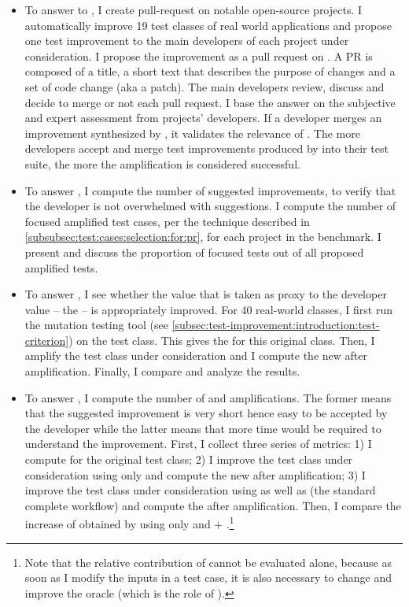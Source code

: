 \begin{itemize}
	\item \textbf{\rqpullrequest}
	To answer to \rqpullrequest, I create pull-request on notable open-source projects.
	I automatically improve 19 test classes of real world applications and propose one test improvement to the main developers of each project under consideration.
	I propose the improvement as a pull request on \gh.
	A PR is composed of a title, a short text that describes the purpose of changes and a set of code change (aka a patch).
	The main developers review, discuss and decide to merge or not each pull request.
	I base the answer on the subjective and expert assessment from projects' developers.
	If a developer merges an improvement synthesized by \dspot, it validates the relevance of \dspot.
	The more developers accept and merge test improvements produced by \dspot into their test suite, the more the amplification is considered successful.
	
	\item \textbf{\rqcandidates{}}
	To answer \rqcandidates{}, I compute the number of suggested improvements, to verify that the developer is not overwhelmed with suggestions.
	I compute the number of focused amplified test cases, per the technique described in \autoref{subsubsec:test:cases:selection:for:pr}, for each project in the benchmark.
	I present and discuss the proportion of focused tests out of all proposed amplified tests.
	
	\item \textbf{\rqeffectiveness}
	To answer \rqeffectiveness, I see whether the value that is taken as proxy to the developer value -- the \ms -- is appropriately improved.
	For 40 real-world classes, I first run the mutation testing tool \pitest (see \autoref{subsec:test-improvement:introduction:test-criterion}) on the test class. 
	This gives the \ams for this original class. 
	Then, I amplify the test class under consideration and I compute the new \ams after amplification. 
	Finally, I compare and analyze the results. 
	
	\item \textbf{\rqAmplVersusIAmpl}
	To answer \rqAmplVersusIAmpl, I compute the number of \Aampl{} and \Iampl{} amplifications. 
	The former means that the suggested improvement is very short hence easy to be accepted by the developer while the latter means that more time would be required to understand the improvement.
	First, I collect three series of metrics: 
	1) I compute \ams for the original test class; 
	2) I improve the test class under consideration using only \Aampl{} and compute the new \ams after amplification; 
	3) I improve the test class under consideration using \Iampl{} as well as \Aampl{} (the standard complete \dspot workflow) and compute the \ams after amplification. 
	Then, I compare the increase of \ms obtained by using \Aampl{} only and \Iampl{} + \Aampl{}.\footnote{Note that the relative contribution of \Iampl{} cannot be evaluated alone, because as soon as I modify the inputs in a test case, it is also necessary to change and improve the oracle (which is the role of \Aampl{}).}
\end{itemize}

